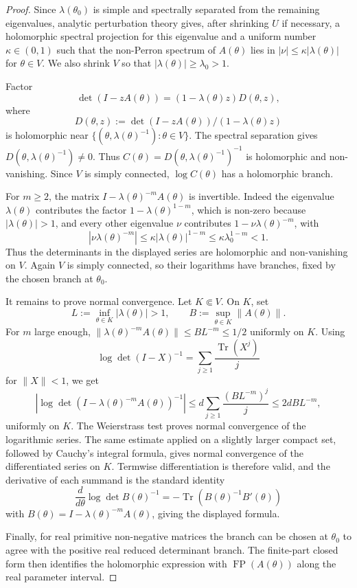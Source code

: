 \documentclass[11pt,a4paper]{amsart}
\theoremstyle{plain}
\theoremstyle{definition}
\theoremstyle{remark}
\DeclareMathOperator{\Tr}{Tr}
\DeclareMathOperator{\FP}{FP}
\begin{document}
\begin{proof}
  Since \(\lambda(\theta_0)\) is simple and spectrally separated from
  the remaining eigenvalues, analytic perturbation theory gives, after
  shrinking \(U\) if necessary, a holomorphic spectral projection for
  this eigenvalue and a uniform number \(\kappa\in(0,1)\) such that the
  non-Perron spectrum of \(A(\theta)\) lies in
  \(|\nu|\le \kappa |\lambda(\theta)|\) for \(\theta\in V\). We also
  shrink \(V\) so that \(|\lambda(\theta)|\ge\lambda_0>1\).

  Factor
  \[
    \det(I-zA(\theta))
    =(1-\lambda(\theta)z)D(\theta,z),
  \]
  where
  \[
    D(\theta,z):=
    \det(I-zA(\theta))/(1-\lambda(\theta)z)
  \]
  is holomorphic near
  \(\{(\theta,\lambda(\theta)^{-1}):\theta\in V\}\). The spectral
  separation gives \(D(\theta,\lambda(\theta)^{-1})\neq0\). Thus
  \(C(\theta)=D(\theta,\lambda(\theta)^{-1})^{-1}\) is holomorphic and
  non-vanishing. Since \(V\) is simply connected, \(\log C(\theta)\)
  has a holomorphic branch.

  For \(m\ge2\), the matrix
  \(I-\lambda(\theta)^{-m}A(\theta)\) is invertible. Indeed the
  eigenvalue \(\lambda(\theta)\) contributes the factor
  \(1-\lambda(\theta)^{1-m}\), which is non-zero because
  \(|\lambda(\theta)|>1\), and every other eigenvalue \(\nu\) contributes
  \(1-\nu\lambda(\theta)^{-m}\), with
  \[
    |\nu\lambda(\theta)^{-m}|
    \le \kappa|\lambda(\theta)|^{1-m}
    \le \kappa\lambda_0^{1-m}<1.
  \]
  Thus the determinants in the displayed series are holomorphic and
  non-vanishing on \(V\). Again \(V\) is simply connected, so their
  logarithms have branches, fixed by the chosen branch at
  \(\theta_0\).

  It remains to prove normal convergence. Let
  \(K\Subset V\). On \(K\), set
  \[
    L:=\inf_{\theta\in K}|\lambda(\theta)|>1,
    \qquad
    B:=\sup_{\theta\in K}\|A(\theta)\|.
  \]
  For \(m\) large enough,
  \(\|\lambda(\theta)^{-m}A(\theta)\|\le BL^{-m}\le1/2\) uniformly on
  \(K\). Using
  \[
    \log\det(I-X)^{-1}
    =
    \sum_{j\ge1}\frac{\Tr(X^j)}{j}
  \]
  for \(\|X\|<1\), we get
  \[
    \left|
      \log\det(I-\lambda(\theta)^{-m}A(\theta))^{-1}
    \right|
    \le
    d\sum_{j\ge1}\frac{(BL^{-m})^j}{j}
    \le 2dB L^{-m},
  \]
  uniformly on \(K\). The Weierstrass test proves normal convergence
  of the logarithmic series. The same estimate applied on a slightly
  larger compact set, followed by Cauchy's integral formula, gives
  normal convergence of the differentiated series on \(K\). Termwise
  differentiation is therefore valid, and the derivative of each summand
  is the standard identity
  \[
    \frac{d}{d\theta}\log\det B(\theta)^{-1}
    =
    -\Tr(B(\theta)^{-1}B'(\theta))
  \]
  with \(B(\theta)=I-\lambda(\theta)^{-m}A(\theta)\), giving the
  displayed formula.

  Finally, for real primitive non-negative matrices the branch can be
  chosen at \(\theta_0\) to agree with the positive real reduced
  determinant branch. The finite-part closed form
   then identifies the
  holomorphic expression with \(\FP(A(\theta))\) along the real
  parameter interval.
\end{proof}
\end{document}
